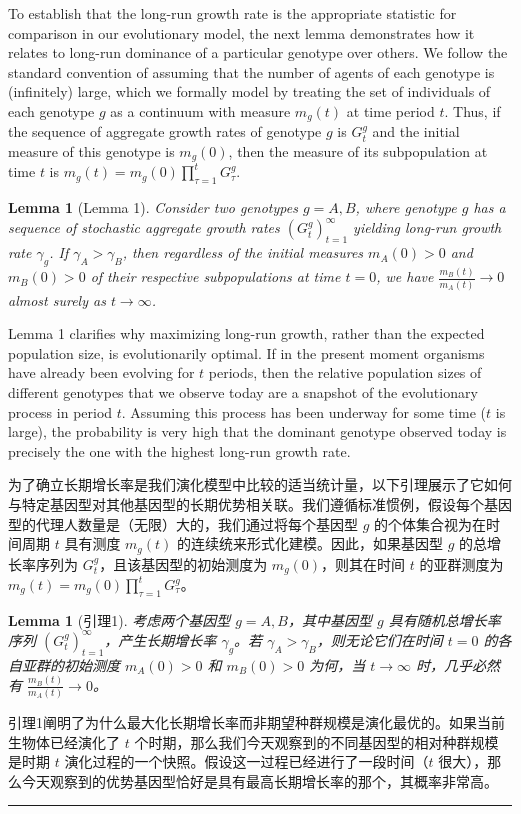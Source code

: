 \documentclass[12pt,a4paper]{article}
\newenvironment{original}
  {\par\noindent\color{black}\smallskip}
  {\par\smallskip}
\newenvironment{translation}
  {\par\noindent\color{blue!70!black}\smallskip}
  {\par\medskip\hrule\medskip}
\newtheorem{lemma}[theorem]{Lemma}
\begin{document}
\begin{original}
To establish that the long-run growth rate is the appropriate statistic for comparison in our evolutionary model, the next lemma demonstrates how it relates to long-run dominance of a particular genotype over others. We follow the standard convention of assuming that the number of agents of each genotype is (infinitely) large, which we formally model by treating the set of individuals of each genotype $g$ as a continuum with measure $m_g(t)$ at time period $t$. Thus, if the sequence of aggregate growth rates of genotype $g$ is $G_t^g$ and the initial measure of this genotype is $m_g(0)$, then the measure of its subpopulation at time $t$ is $m_g(t) = m_g(0) \prod_{\tau=1}^{t} G_\tau^g$.

\begin{lemma}[Lemma 1]
Consider two genotypes $g = A, B$, where genotype $g$ has a sequence of stochastic aggregate growth rates $(G_t^g)_{t=1}^{\infty}$ yielding long-run growth rate $\gamma_g$. If $\gamma_A > \gamma_B$, then regardless of the initial measures $m_A(0) > 0$ and $m_B(0) > 0$ of their respective subpopulations at time $t = 0$, we have $\frac{m_B(t)}{m_A(t)} \to 0$ almost surely as $t \to \infty$.
\end{lemma}

Lemma 1 clarifies why maximizing long-run growth, rather than the expected population size, is evolutionarily optimal. If in the present moment organisms have already been evolving for $t$ periods, then the relative population sizes of different genotypes that we observe today are a snapshot of the evolutionary process in period $t$. Assuming this process has been underway for some time ($t$ is large), the probability is very high that the dominant genotype observed today is precisely the one with the highest long-run growth rate.
\end{original}
\begin{translation}
为了确立长期增长率是我们演化模型中比较的适当统计量，以下引理展示了它如何与特定基因型对其他基因型的长期优势相关联。我们遵循标准惯例，假设每个基因型的代理人数量是（无限）大的，我们通过将每个基因型 $g$ 的个体集合视为在时间周期 $t$ 具有测度 $m_g(t)$ 的连续统来形式化建模。因此，如果基因型 $g$ 的总增长率序列为 $G_t^g$，且该基因型的初始测度为 $m_g(0)$，则其在时间 $t$ 的亚群测度为 $m_g(t) = m_g(0) \prod_{\tau=1}^{t} G_\tau^g$。

\begin{lemma}[引理1]
考虑两个基因型 $g = A, B$，其中基因型 $g$ 具有随机总增长率序列 $(G_t^g)_{t=1}^{\infty}$，产生长期增长率 $\gamma_g$。若 $\gamma_A > \gamma_B$，则无论它们在时间 $t = 0$ 的各自亚群的初始测度 $m_A(0) > 0$ 和 $m_B(0) > 0$ 为何，当 $t \to \infty$ 时，几乎必然有 $\frac{m_B(t)}{m_A(t)} \to 0$。
\end{lemma}

引理1阐明了为什么最大化长期增长率而非期望种群规模是演化最优的。如果当前生物体已经演化了 $t$ 个时期，那么我们今天观察到的不同基因型的相对种群规模是时期 $t$ 演化过程的一个快照。假设这一过程已经进行了一段时间（$t$ 很大），那么今天观察到的优势基因型恰好是具有最高长期增长率的那个，其概率非常高。
\end{translation}
\end{document}
